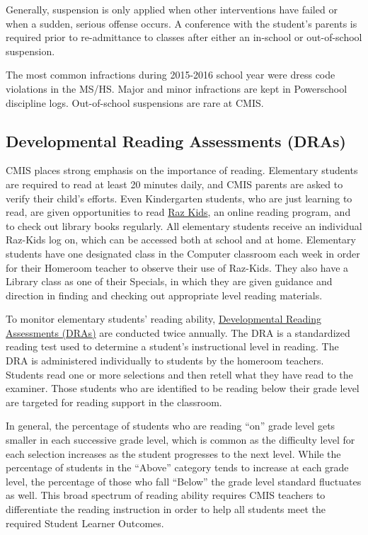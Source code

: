 Generally, suspension is only applied when other interventions have failed or when a sudden, serious offense occurs. A conference with the student’s parents is required prior to re-admittance to classes after either an in-school or out-of-school suspension. 

The most common infractions during 2015-2016 school year were dress code violations in the MS/HS.  Major and minor infractions are kept in Powerschool discipline logs. Out-of-school suspensions are rare at CMIS.


\subsection{Developmental Reading Assessments (DRAs)}

CMIS places strong emphasis on the importance of reading.  Elementary students are required to read at least 20 minutes daily, and CMIS parents are asked to verify their child’s efforts.  Even Kindergarten students, who are just learning to read, are given opportunities to read \href{https://www.raz-kids.com/}{Raz Kids}, an online reading program, and to check out library books regularly.  All elementary students receive an individual Raz-Kids log on, which can be accessed both at school and at home.  Elementary students have one designated class in the Computer classroom each week in order for their Homeroom teacher to observe their use of Raz-Kids.  They also have a Library class as one of their Specials, in which they are given guidance and direction in finding and checking out appropriate level reading materials.  

To monitor elementary students’ reading ability, \href{https://drive.google.com/open?id=0ByVFfrm0zfolV29lcmM1WXVQOXc}{Developmental Reading Assessments (DRAs)} are conducted twice annually.  The DRA is a standardized reading test used to determine a student’s instructional level in reading. The DRA is administered individually to students by the homeroom teachers. Students read one or more selections and then retell what they have read to the examiner. Those students who are identified to be reading below their grade level are targeted for reading support in the classroom. 

In general, the percentage of students who are reading “on” grade level gets smaller in each successive grade level, which is common as the difficulty level for each selection increases as the student progresses to the next level. While the percentage of students in the “Above” category tends to increase at each grade level, the percentage of those who fall “Below” the grade level standard fluctuates as well. This broad spectrum of reading ability requires CMIS teachers to differentiate the reading instruction in order to help all students meet the required Student Learner Outcomes.  

